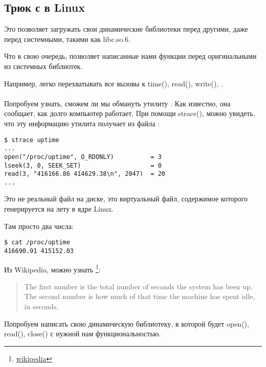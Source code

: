 \subsection{Трюк с  в Linux}

\label{ld_preload}

Это позволяет загружать свои динамические библиотеки перед другими, даже перед системными, такими как libc.so.6.

Что в свою очередь, позволяет  написанные нами функции перед оригинальными из системных библиотек.

Например, легко перехватывать все вызовы к time(), read(), write(), \etc{}. \\
\\
Попробуем узнать, сможем ли мы обмануть утилиту .
Как известно, она сообщает, как долго компьютер работает.
При помощи strace(), можно увидеть, что эту информацию утилита получает из файла :

\begin{lstlisting}
$ strace uptime 
...
open("/proc/uptime", O_RDONLY)          = 3
lseek(3, 0, SEEK_SET)                   = 0
read(3, "416166.86 414629.38\n", 2047)  = 20
...
\end{lstlisting}

Это не реальный файл на диске, это виртуальный файл, содержимое которого генерируется на лету в ядре Linux.

Там просто два числа:

\begin{lstlisting}
$ cat /proc/uptime
416690.91 415152.03
\end{lstlisting}

Из Wikipedia, можно узнать
\footnote{\href{http://go.yurichev.com/17043}{wikipedia}}:

\begin{framed}
\begin{quotation}
The first number is the total number of seconds the system has been up.
The second number is how much of that time the machine has spent idle, in seconds.
\end{quotation}
\end{framed}

Попробуем написать свою динамическую библиотеку, в которой будет open(), read(), close() с нужной нам функциональностью.

